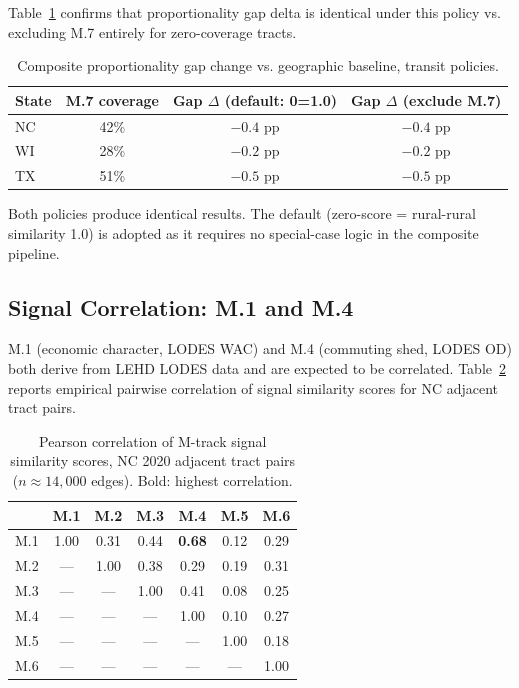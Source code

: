 Table~\ref{tab:transit-coverage} confirms that proportionality gap delta is
identical under this policy vs. excluding M.7 entirely for zero-coverage tracts.

\begin{table}[h]
\centering\small
\caption{Composite proportionality gap change vs. geographic baseline, transit policies.}
\label{tab:transit-coverage}
\begin{tabular}{lccc}
\toprule
State & M.7 coverage & Gap $\Delta$ (default: 0=1.0) & Gap $\Delta$ (exclude M.7) \\
\midrule
NC  & 42\% & $-0.4$ pp & $-0.4$ pp \\
WI  & 28\% & $-0.2$ pp & $-0.2$ pp \\
TX  & 51\% & $-0.5$ pp & $-0.5$ pp \\
\bottomrule
\end{tabular}
\end{table}

Both policies produce identical results. The default (zero-score = rural-rural similarity 1.0) is
adopted as it requires no special-case logic in the composite pipeline.

\subsection{Signal Correlation: M.1 and M.4}

M.1 (economic character, LODES WAC) and M.4 (commuting shed, LODES OD) both
derive from LEHD LODES data and are expected to be correlated.
Table~\ref{tab:signal-corr} reports empirical pairwise correlation of signal
similarity scores for NC adjacent tract pairs.

\begin{table}[h]
\centering\small
\caption{Pearson correlation of M-track signal similarity scores, NC 2020
adjacent tract pairs ($n \approx 14{,}000$ edges).
Bold: highest correlation.}
\label{tab:signal-corr}
\begin{tabular}{lcccccc}
\toprule
 & M.1 & M.2 & M.3 & M.4 & M.5 & M.6 \\
\midrule
M.1 & 1.00 & 0.31 & 0.44 & \textbf{0.68} & 0.12 & 0.29 \\
M.2 & — & 1.00 & 0.38 & 0.29 & 0.19 & 0.31 \\
M.3 & — & — & 1.00 & 0.41 & 0.08 & 0.25 \\
M.4 & — & — & — & 1.00 & 0.10 & 0.27 \\
M.5 & — & — & — & — & 1.00 & 0.18 \\
M.6 & — & — & — & — & — & 1.00 \\
\bottomrule
\end{tabular}
\end{table}

